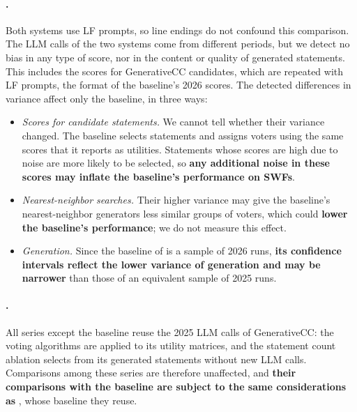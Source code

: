 \documentclass[letterpaper]{article} %
\begin{document}
\paragraph{.}
Both systems use LF prompts, so line endings do not confound this comparison.
The LLM calls of the two systems come from different periods, but we detect no bias in any type of score, nor in the content or quality of generated statements.
This includes the scores for GenerativeCC candidates, which are repeated with LF prompts, the format of the baseline's 2026 scores.
The detected differences in variance affect only the baseline, in three ways:
\begin{itemize}
    \item \emph{Scores for candidate statements.}
    We cannot tell whether their variance changed.
    The baseline selects statements and assigns voters using the same scores that it reports as utilities.
    Statements whose scores are high due to noise are more likely to be selected, so \textbf{any additional noise in these scores may inflate the baseline's performance on SWFs}.
    \item \emph{Nearest-neighbor searches.}
    Their higher variance may give the baseline's nearest-neighbor generators less similar groups of voters, which could \textbf{lower the baseline's performance}; we do not measure this effect.
    \item \emph{Generation.}
    Since the baseline of  is a sample of 2026 runs, \textbf{its confidence intervals reflect the lower variance of generation and may be narrower} than those of an equivalent sample of 2025 runs.
\end{itemize}

\paragraph{.}
All series except the baseline reuse the 2025 LLM calls of GenerativeCC: the voting algorithms are applied to its utility matrices, and the statement count ablation selects from its generated statements without new LLM calls.
Comparisons among these series are therefore unaffected, and \textbf{their comparisons with the baseline are subject to the same considerations as }, whose baseline they reuse.
\end{document}
